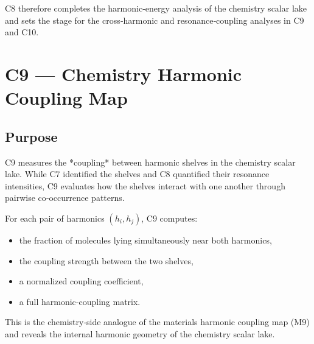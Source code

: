 \documentclass[11pt, letterpaper, openany]{book}
\begin{document}
C8 therefore completes the harmonic‑energy analysis of the chemistry scalar lake
and sets the stage for the cross‑harmonic and resonance‑coupling analyses in
C9 and C10.


\section{C9 — Chemistry Harmonic Coupling Map}

\subsection*{Purpose}
C9 measures the *coupling* between harmonic shelves in the chemistry scalar lake.
While C7 identified the shelves and C8 quantified their resonance intensities,
C9 evaluates how the shelves interact with one another through pairwise
co‑occurrence patterns.

For each pair of harmonics \((h_i, h_j)\), C9 computes:

\begin{itemize}
    \item the fraction of molecules lying simultaneously near both harmonics,
    \item the coupling strength between the two shelves,
    \item a normalized coupling coefficient,
    \item a full harmonic‑coupling matrix.
\end{itemize}

This is the chemistry‑side analogue of the materials harmonic coupling map (M9)
and reveals the internal harmonic geometry of the chemistry scalar lake.
\end{document}
